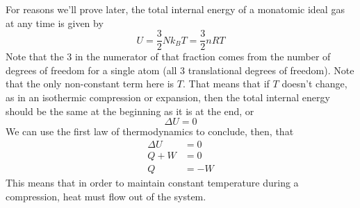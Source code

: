 \documentclass[a4paper]{article}
\begin{document}
\begin{center}
\end{center}
For reasons we'll prove later, the total internal energy of a
monatomic ideal gas at any time is given by
\[ U = \frac{3}{2}N k_B T = \frac{3}{2} nRT \]
Note that the 3 in the numerator of that fraction comes from the number of
degrees of freedom for a single atom (all 3 translational degrees of freedom).
Note that the only non-constant term here is $T$. That means that if $T$
doesn't change, as in an isothermic compression or expansion, then the total
internal energy should be the same at the beginning as it is at the end, or
\[ \Delta U = 0 \]
We can use the first law of thermodynamics to conclude, then, that
\begin{align*}
	\Delta U &= 0\\
	Q + W &= 0\\
	Q &= -W
\end{align*}
This means that in order to maintain constant temperature during a compression,
heat must flow out of the system.
\end{document}
